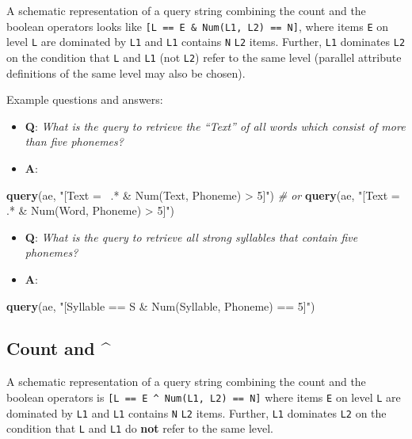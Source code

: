 \documentclass[]{book}
\newenvironment{Shaded}{\begin{snugshade}}{\end{snugshade}}
\newcommand{\CommentTok}[1]{\textcolor[rgb]{0.56,0.35,0.01}{\textit{#1}}}
\newcommand{\KeywordTok}[1]{\textcolor[rgb]{0.13,0.29,0.53}{\textbf{#1}}}
\newcommand{\NormalTok}[1]{#1}
\newcommand{\StringTok}[1]{\textcolor[rgb]{0.31,0.60,0.02}{#1}}
\providecommand{\tightlist}{%
  \setlength{\itemsep}{0pt}\setlength{\parskip}{0pt}}
\begin{document}
A schematic representation of a query string combining the count and the boolean operators looks like \texttt{{[}L\ ==\ E\ \&\ Num(L1,\ L2)\ ==\ N{]}}, where items \texttt{E} on level \texttt{L} are dominated by \texttt{L1} and \texttt{L1} contains \texttt{N} \texttt{L2} items. Further, \texttt{L1} dominates \texttt{L2} on the condition that \texttt{L} and \texttt{L1} (not \texttt{L2}) refer to the same level (parallel attribute definitions of the same level may also be chosen).

Example questions and answers:

\begin{itemize}
\tightlist
\item
  \textbf{Q}: \emph{What is the query to retrieve the ``Text'' of all words which consist of more than five phonemes?}
\item
  \textbf{A}:
\end{itemize}

\begin{Shaded}
\begin{Highlighting}[]
\KeywordTok{query}\NormalTok{(ae, }\StringTok{"[Text =~ .* & Num(Text, Phoneme) > 5]"}\NormalTok{) }
\CommentTok{# or }
\KeywordTok{query}\NormalTok{(ae, }\StringTok{"[Text =~ .* & Num(Word, Phoneme) > 5]"}\NormalTok{)}
\end{Highlighting}
\end{Shaded}

\begin{itemize}
\tightlist
\item
  \textbf{Q}: \emph{What is the query to retrieve all strong syllables that contain five phonemes?}
\item
  \textbf{A}:
\end{itemize}

\begin{Shaded}
\begin{Highlighting}[]
\KeywordTok{query}\NormalTok{(ae, }\StringTok{"[Syllable == S & Num(Syllable, Phoneme) == 5]"}\NormalTok{)}
\end{Highlighting}
\end{Shaded}

\hypertarget{count-and}{%
\subsection{Count and \^{}}\label{count-and}}

A schematic representation of a query string combining the count and the boolean operators is \texttt{{[}L\ ==\ E\ \^{}\ Num(L1,\ L2)\ ==\ N{]}} where items \texttt{E} on level \texttt{L} are dominated by \texttt{L1} and \texttt{L1} contains \texttt{N} \texttt{L2} items. Further, \texttt{L1} dominates \texttt{L2} on the condition that \texttt{L} and \texttt{L1} do \textbf{not} refer to the same level.
\end{document}
